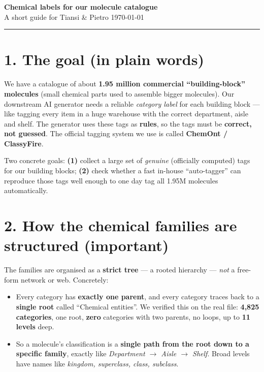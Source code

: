 \documentclass[11pt]{article}
\begin{document}
\begin{center}
{\LARGE\bfseries Chemical labels for our molecule catalogue}\\[3pt]
{\normalsize A short guide for Tiansi \& Pietro \hfill \today}
\end{center}
\vspace{-3pt}\hrule\vspace{7pt}

\section*{1. The goal (in plain words)}
We have a catalogue of about \textbf{1.95 million commercial ``building-block'' molecules}
(small chemical parts used to assemble bigger molecules). Our downstream AI generator needs a
reliable \emph{category label} for each building block --- like tagging every item in a huge
warehouse with the correct department, aisle and shelf. The generator uses these tags as
\textbf{rules}, so the tags must be \textbf{correct, not guessed}. The official tagging system we
use is called \textbf{ChemOnt / ClassyFire}.

Two concrete goals: \textbf{(1)} collect a large set of \emph{genuine} (officially computed) tags
for our building blocks; \textbf{(2)} check whether a fast in-house ``auto-tagger'' can reproduce
those tags well enough to one day tag all 1.95M molecules automatically.

\section*{2. How the chemical families are structured (important)}
The families are organised as a \textbf{strict tree} --- a rooted hierarchy --- \emph{not} a
free-form network or web. Concretely:
\begin{itemize}
  \item Every category has \textbf{exactly one parent}, and every category traces back to a
        \textbf{single root} called ``Chemical entities''. We verified this on the real file:
        \textbf{4{,}825 categories}, one root, \textbf{zero} categories with two parents, no loops,
        up to \textbf{11 levels} deep.
  \item So a molecule's classification is a \textbf{single path from the root down to a specific
        family}, exactly like \emph{Department $\rightarrow$ Aisle $\rightarrow$ Shelf}. Broad
        levels have names like \emph{kingdom, superclass, class, subclass}.
\end{itemize}
\end{document}
